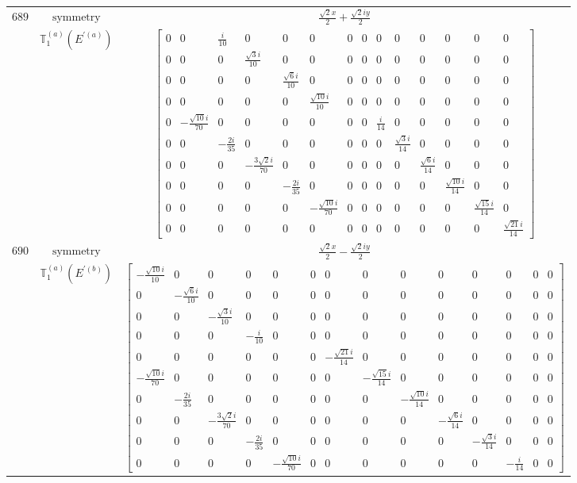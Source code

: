 \documentclass[fleqn,8pt,landscape]{jsarticle}
\begin{document}
\begin{longtable}{ccc}
$ 689 $ & $ \text{symmetry} $ & $ \frac{\sqrt{2} x}{2} + \frac{\sqrt{2} i y}{2} $ \\
$  $ & $ \mathbb{T}_{1}^{(a)}(E^{\prime(a)}) $ & $ \begin{bmatrix} 0 & 0 & \frac{i}{10} & 0 & 0 & 0 & 0 & 0 & 0 & 0 & 0 & 0 & 0 & 0 \\ 0 & 0 & 0 & \frac{\sqrt{3} i}{10} & 0 & 0 & 0 & 0 & 0 & 0 & 0 & 0 & 0 & 0 \\ 0 & 0 & 0 & 0 & \frac{\sqrt{6} i}{10} & 0 & 0 & 0 & 0 & 0 & 0 & 0 & 0 & 0 \\ 0 & 0 & 0 & 0 & 0 & \frac{\sqrt{10} i}{10} & 0 & 0 & 0 & 0 & 0 & 0 & 0 & 0 \\ 0 & - \frac{\sqrt{10} i}{70} & 0 & 0 & 0 & 0 & 0 & 0 & \frac{i}{14} & 0 & 0 & 0 & 0 & 0 \\ 0 & 0 & - \frac{2 i}{35} & 0 & 0 & 0 & 0 & 0 & 0 & \frac{\sqrt{3} i}{14} & 0 & 0 & 0 & 0 \\ 0 & 0 & 0 & - \frac{3 \sqrt{2} i}{70} & 0 & 0 & 0 & 0 & 0 & 0 & \frac{\sqrt{6} i}{14} & 0 & 0 & 0 \\ 0 & 0 & 0 & 0 & - \frac{2 i}{35} & 0 & 0 & 0 & 0 & 0 & 0 & \frac{\sqrt{10} i}{14} & 0 & 0 \\ 0 & 0 & 0 & 0 & 0 & - \frac{\sqrt{10} i}{70} & 0 & 0 & 0 & 0 & 0 & 0 & \frac{\sqrt{15} i}{14} & 0 \\ 0 & 0 & 0 & 0 & 0 & 0 & 0 & 0 & 0 & 0 & 0 & 0 & 0 & \frac{\sqrt{21} i}{14} \end{bmatrix} $ \\ \hline
$ 690 $ & $ \text{symmetry} $ & $ \frac{\sqrt{2} x}{2} - \frac{\sqrt{2} i y}{2} $ \\
$  $ & $ \mathbb{T}_{1}^{(a)}(E^{\prime(b)}) $ & $ \begin{bmatrix} - \frac{\sqrt{10} i}{10} & 0 & 0 & 0 & 0 & 0 & 0 & 0 & 0 & 0 & 0 & 0 & 0 & 0 \\ 0 & - \frac{\sqrt{6} i}{10} & 0 & 0 & 0 & 0 & 0 & 0 & 0 & 0 & 0 & 0 & 0 & 0 \\ 0 & 0 & - \frac{\sqrt{3} i}{10} & 0 & 0 & 0 & 0 & 0 & 0 & 0 & 0 & 0 & 0 & 0 \\ 0 & 0 & 0 & - \frac{i}{10} & 0 & 0 & 0 & 0 & 0 & 0 & 0 & 0 & 0 & 0 \\ 0 & 0 & 0 & 0 & 0 & 0 & - \frac{\sqrt{21} i}{14} & 0 & 0 & 0 & 0 & 0 & 0 & 0 \\ - \frac{\sqrt{10} i}{70} & 0 & 0 & 0 & 0 & 0 & 0 & - \frac{\sqrt{15} i}{14} & 0 & 0 & 0 & 0 & 0 & 0 \\ 0 & - \frac{2 i}{35} & 0 & 0 & 0 & 0 & 0 & 0 & - \frac{\sqrt{10} i}{14} & 0 & 0 & 0 & 0 & 0 \\ 0 & 0 & - \frac{3 \sqrt{2} i}{70} & 0 & 0 & 0 & 0 & 0 & 0 & - \frac{\sqrt{6} i}{14} & 0 & 0 & 0 & 0 \\ 0 & 0 & 0 & - \frac{2 i}{35} & 0 & 0 & 0 & 0 & 0 & 0 & - \frac{\sqrt{3} i}{14} & 0 & 0 & 0 \\ 0 & 0 & 0 & 0 & - \frac{\sqrt{10} i}{70} & 0 & 0 & 0 & 0 & 0 & 0 & - \frac{i}{14} & 0 & 0 \end{bmatrix} $ \\ \hline

\end{longtable}
\end{document}

